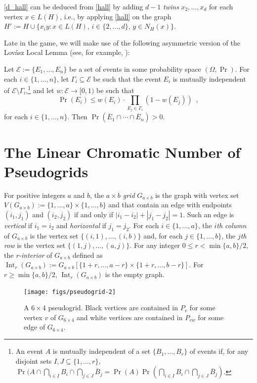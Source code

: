 \documentclass{patmorin}
\DeclareMathOperator{\interior}{Int}
\newcommand{\defin}[1]{\emph{\color{brightmaroon}#1}}
\begin{document}
\cref{d_hall} can be deduced from \cref{hall} by adding $d-1$ \defin{twins} $x_2,\ldots,x_d$ for each vertex $x\in L(H)$, i.e., by applying \cref{hall} on the graph $H':=H\cup\{x_iy:x\in L(H),\, i\in\{2,\ldots,d\},\, y\in N_H(x)\}$.


Late in the game, we will make use of the following asymmetric version of the Lovász Local Lemma (see, for example, \citet[Lemma~5.1.1]{alon.spencer:probabilistic}):

\begin{lem}\label{weighted_lovasz}
  Let $\mathcal{E}:=\{E_1,\ldots,E_n\}$ be a set of events in some probability space $(\Omega,\Pr)$.  For each $i\in\{1,\ldots,n\}$, let $\Gamma_i\subseteq \mathcal{E}$ be such that the event $E_i$ is mutually independent of $\mathcal{E}\setminus \Gamma_i$,\footnote{An event $A$ is mutually independent of a set $\{B_1,\ldots,B_r\}$ of events if, for any disjoint sets $I,J\subseteq\{1,\ldots,r\}$, $\Pr(A\cap\bigcap_{i\in I} B_i\cap\bigcap_{j\in J} \overline{B}_j=\Pr(A)\Pr(\bigcap_{i\in I} B_i\cap\bigcap_{j\in J} \overline{B}_j)$.} and let $w:\mathcal{E}\to[0,1)$ be such that
  \[
      \Pr(E_i) \le w(E_i)\cdot\prod_{E_j\in\Gamma_i}(1-w(E_j))  \enspace ,
  \]
  for each $i\in\{1,\ldots,n\}$.
  Then $\Pr(\overline{E}_1\cap\cdots\cap\overline{E}_n) > 0$.
\end{lem}


\section{The Linear Chromatic Number of Pseudogrids}

For positive integers $a$ and $b$, the \defin{$a\times b$ grid} $G_{a\times b}$ is the graph with vertex set $V(G_{a\times b}):=\{1,\ldots,a\}\times\{1,\ldots,b\}$ and that contain an edge with endpoints $(i_1,j_1)$ and $(i_2,j_2)$ if and only if $|i_1-i_2|+|j_1-j_2|=1$.  Such an edge is \defin{vertical} if $i_1=i_2$ and \defin{horizontal} if $j_1=j_2$.  For each $i\in\{1,\ldots,a\}$, the \defin{$i$th column} of $G_{a\times b}$ is the vertex set $\{(i,1),\ldots,(i,b)\}$ and, for each $j\in\{1,\ldots,b\}$, the \defin{$j$th row} is the vertex set $\{(1,j),\ldots,(a,j)\}$.  For any integer $0\le r<\min\{a,b\}/2$, the \defin{r-interior} of $G_{a\times b}$ defined as $\interior_r(G_{a\times b}):=G_{a\times b}[\{1+r,\ldots,a-r\}\times\{1+r,\ldots,b-r\}]$.  For $r\ge\min\{a,b\}/2$, $\interior_r(G_{a\times b})$ is the empty graph.

\begin{figure}
  \begin{center}
    \texttt{[image: figs/pseudogrid-2]}
  \end{center}
  \caption{A $6\times 4$ pseudogrid.  Black vertices are contained in $P_v$ for some vertex $v$ of $G_{6\times 4}$ and white vertices are contained in $P_{vw}$ for some edge of $G_{6\times 4}$.}
  \label{pseudogrid_fig}
\end{figure}
\end{document}
